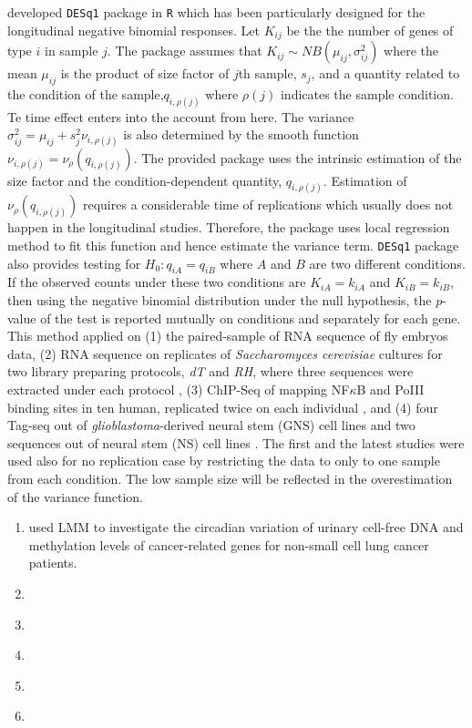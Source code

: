 \documentclass[]{article}
\begin{document}
		\cite{Anders2010} developed \texttt{DESq1} package in \texttt{R} which has been particularly designed for the longitudinal negative binomial responses. Let $K_{ij}$ be the the number of genes of type $i$ in sample $j$. The package assumes that $K_{ij}\sim NB(\mu_{ij},\sigma^2_{ij})$ where the mean $\mu_{ij}$ is the product of size factor of $j$th sample, $s_j$, and a quantity related to the condition of the sample,$q_{i,\rho(j)}$ where $\rho(j)$ indicates the sample condition. Te time effect enters into the account from here. The variance $\sigma_{ij}^2=\mu_{ij}+s_j^2\nu_{i,\rho(j)}$ is also determined by the smooth function $\nu_{i,\rho(j)}=\nu_{\rho}(q_{i,\rho(j)})$. The provided package uses the intrinsic estimation of the size factor and the condition-dependent quantity, $q_{i,\rho(j)}$. Estimation of $\nu_{\rho}(q_{i,\rho(j)})$ requires a considerable time of replications which usually does not happen in the longitudinal studies. Therefore, the package uses local regression method to fit this function and hence estimate the variance term. \texttt{DESq1} package also provides testing for $H_0:q_{iA}=q_{iB}$ where $A$ and $B$ are two different conditions. If the observed counts under these two conditions are $K_{iA}=k_{iA}$ and $K_{iB}=k_{iB}$, then using the negative binomial distribution under the null hypothesis, the $p$-value of the test is reported mutually on conditions and separately for each gene. This method applied on (1) the paired-sample of RNA sequence of fly embryos data, (2) RNA sequence on replicates of \textit{Saccharomyces cerevisiae} cultures for two library preparing protocols, \textit{dT} and \textit{RH}, where three sequences were extracted under each protocol \citep{Nagalakshmi2008}, (3) ChIP-Seq of mapping NF$\kappa$B and PoIII binding sites in ten human, replicated twice on each individual \citep{Kasowski2010}, and (4) four Tag-seq out of \textit{glioblastoma}-derived neural stem (GNS) cell lines and two sequences out of neural stem (NS) cell lines \citep{Engstrm2012}. The first and the latest studies were used also for no replication case by restricting the data to only to one sample from each condition. The low sample size will be reflected in the overestimation of the variance function. 
		
		
		
		\begin{enumerate}
			\item \cite{Bach2021} used LMM to investigate the circadian variation of urinary cell-free DNA and methylation levels of cancer-related genes for non-small cell lung cancer patients. 
			\item \cite{ChenLi2016}
			\item \cite{Vasaikaretal2023}
			\item \cite{Bernardesetal2020}
			\item \cite{Marsetal2020}
			\item \cite{SchsslerFiorenzaRoseetal2019}
		\end{enumerate}
		
\end{document}

